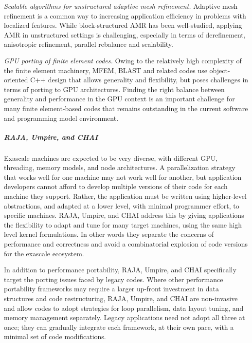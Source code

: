 \vspace {0.5 em}
\noindent
\textit{Scalable algorithms for unstructured adaptive mesh refinement.}
Adaptive mesh refinement is a common way to increasing application efficiency
in problems with localized features. While block-structured AMR has been
well-studied, applying AMR in unstructured settings is challenging, especially
in terms of derefinement, anisotropic refinement, parallel rebalance and
scalability.


\vspace {0.5 em}
\noindent
\textit{GPU porting of finite element codes.}
Owing to the relatively high complexity of the finite element machinery, MFEM,
BLAST and related codes use object-oriented C++ design that allows generality
and flexibility, but poses challenges in terms of porting to GPU architectures.
Finding the right balance between generality and performance in the GPU context
is an important challenge for many finite element-based codes that remains
outstanding in the current software and programming model environment.

\subparagraph{RAJA, Umpire, and CHAI}
Exascale machines are expected to be very diverse, with different GPU,
threading, memory models, and node architectures.  A parallelization
strategy that works well for one machine may not work well for another,
but application developers cannot afford to develop multiple versions of
their code for each machine they support.  Rather, the application must
be written using higher-level abstractions, and adapted at a lower level,
with minimal programmer effort, to specific machines.  RAJA, Umpire, and
CHAI address this by giving applications the flexibility to adapt and
tune for many target machines, using the same high level kernel
formulations.  In other words they separate the concerns of performance
and correctness and avoid a combinatorial explosion of code versions for
the exascale ecosystem.

In addition to performance portability, RAJA, Umpire, and CHAI
specifically target the porting issues faced by legacy codes.  Where
other performance portability frameworks may require a larger up-front
investment in data structures and code restructuring, RAJA, Umpire, and
CHAI are non-invasive and allow codes to adopt strategies for loop
parallelism, data layout tuning, and memory management separately.
Legacy applications need not adopt all three at once; they can gradually
integrate each framework, at their own pace, with a minimal set of code
modifications.


